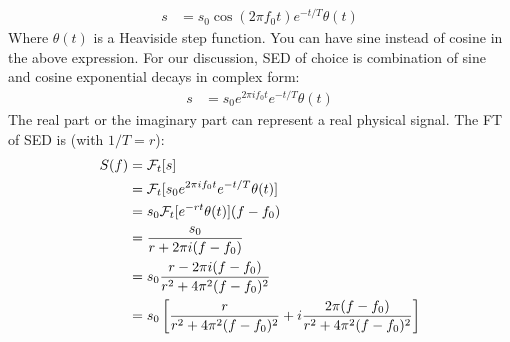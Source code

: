 \documentclass[letterpaper, 11pt]{article}
\newcommand{\fourier}[2]{\mathcal{F}_{#1}[#2]} %
\newcommand{\sed}[1]{s_{0}e^{2\pi if_{0}#1}e^{-#1/T}} %
\numberwithin{equation}{section}
\begin{document}
\begin{align}
	s &= s_{0}\cos{(2\pi f_{0}t)}e^{-t/T} \theta(t)
\end{align}
Where \(\theta (t)\) is a Heaviside step function. You can have sine instead of cosine in the above expression. For our discussion, SED of choice is combination of sine and cosine exponential decays in complex form:
\begin{align}
	s &= \sed{t} \theta (t)
\end{align}
The real part or the imaginary part can represent a real physical signal. The FT of SED is (with \(1/T = r\)):
\begin{equation}
	\begin{aligned}[b]
		S(f)	&= \fourier{t}{s}\\
			&= \fourier{t}{\sed{t} \theta (t)}\\
			&= s_{0}\fourier{t}{e^{-rt} \theta (t)}(f - f_{0})\\
			&= \frac{s_{0}}{r + 2\pi i(f - f_{0})} \\
			\gdef\temp{r^2 + 4\pi^{2}(f - f_{0})^2} %
			&= s_{0}\frac{r - 2\pi i(f - f_{0})}{\temp}\\
			&= s_{0}\left[\frac{r}{\temp} + i\frac{2\pi(f - f_{0})}{\temp} \right]
	\end{aligned}
\end{equation}
\printindex
\end{document}
